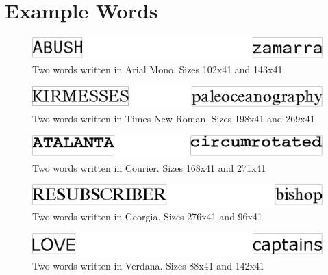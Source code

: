 
\chapter{Example Words}
\label{ch:example_words}
\begin{figure}[H]
    \centering
    \includegraphics[width=1\textwidth]{fig/appendix_b/arial.png}
    \captionsetup{justification=centering}
    \caption{Two words written in Arial Mono. Sizes 102x41 and 143x41}
\end{figure}

\begin{figure}[H]
    \centering
    \includegraphics[width=1\textwidth]{fig/appendix_b/timesnewroman.png}
    \captionsetup{justification=centering}
    \caption{Two words written in Times New Roman. Sizes 198x41 and 269x41}
\end{figure}

\begin{figure}[H]
    \centering
    \includegraphics[width=1\textwidth]{fig/appendix_b/courier.png}
    \captionsetup{justification=centering}
    \caption{Two words written in Courier. Sizes 168x41 and 271x41}
\end{figure}

\begin{figure}[H]
    \centering
    \includegraphics[width=1\textwidth]{fig/appendix_b/georgia.png}
    \captionsetup{justification=centering}
    \caption{Two words written in Georgia. Sizes 276x41 and 96x41}
\end{figure}

\begin{figure}[H]
    \centering
    \includegraphics[width=1\textwidth]{fig/appendix_b/verdana.png}
    \captionsetup{justification=centering}
    \caption{Two words written in Verdana. Sizes 88x41 and 142x41}
\end{figure}